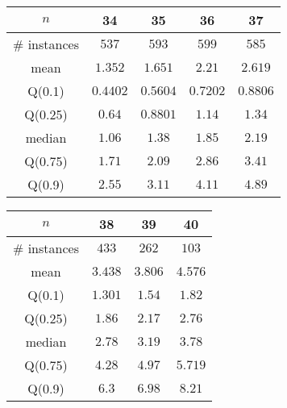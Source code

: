 \begin{tabular}{c|cccc} 
\hline 
$n$ & 34 & 35 & 36 & 37 \tabularnewline 
\hline 
\hline 
\# instances & $537$ & $593$ & $599$ & $585$ \tabularnewline 
mean & $1.352$ & $1.651$ & $2.21$ & $2.619$ \tabularnewline 
Q(0.1) & $0.4402$ & $0.5604$ & $0.7202$ & $0.8806$ \tabularnewline 
Q(0.25) & $0.64$ & $0.8801$ & $1.14$ & $1.34$ \tabularnewline 
median & $1.06$ & $1.38$ & $1.85$ & $2.19$ \tabularnewline 
Q(0.75) & $1.71$ & $2.09$ & $2.86$ & $3.41$ \tabularnewline 
Q(0.9) & $2.55$ & $3.11$ & $4.11$ & $4.89$ \tabularnewline 
\hline 
\end{tabular} 
\medskip{} 

\begin{tabular}{c|ccc} 
\hline 
$n$ & 38 & 39 & 40 \tabularnewline 
\hline 
\hline 
\# instances & $433$ & $262$ & $103$ \tabularnewline 
mean & $3.438$ & $3.806$ & $4.576$ \tabularnewline 
Q(0.1) & $1.301$ & $1.54$ & $1.82$ \tabularnewline 
Q(0.25) & $1.86$ & $2.17$ & $2.76$ \tabularnewline 
median & $2.78$ & $3.19$ & $3.78$ \tabularnewline 
Q(0.75) & $4.28$ & $4.97$ & $5.719$ \tabularnewline 
Q(0.9) & $6.3$ & $6.98$ & $8.21$ \tabularnewline 
\hline 
\end{tabular} 
\medskip{} 

